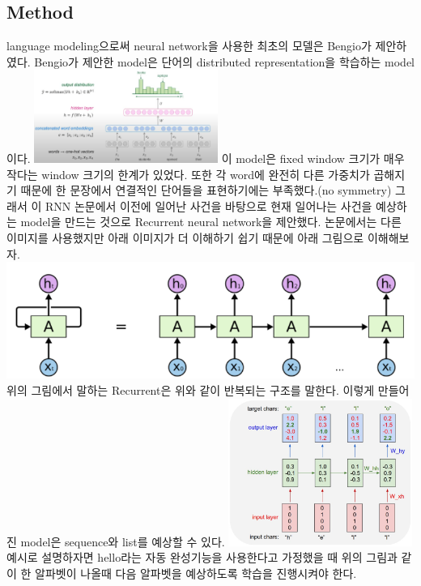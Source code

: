 \documentclass[extendedabs]{bmvc2k}
\begin{document}
 \subsection{Method}
 \quad  language modeling으로써 neural network을 사용한 최초의 모델은 Bengio가 제안하였다\cite{bengio2000neural}. Bengio가 제안한 model은 단어의 distributed representation을 
 학습하는 model이다. 
 \newline  \includegraphics[width=6cm]{images/07_language.PNG}
 \newline 이 model은 fixed window 크기가 매우 작다는 window 크기의 한계가 있었다. 또한 각 word에 완전히 다른 가중치가 곱해지기 때문에
 한 문장에서 연결적인 단어들을 표현하기에는 부족했다.(no symmetry) 그래서 이 RNN 논문에서 이전에 일어난 사건을 바탕으로 현재 일어나는 사건을
 예상하는 model을 만드는 것으로 Recurrent neural network을 제안했다. 논문에서는 다른 이미지를 사용했지만 아래 이미지가 더 이해하기 쉽기 때문에 아래 그림으로
 이해해보자. 
 \newline  \includegraphics[width=\linewidth]{images/00_language.PNG}
 위의 그림에서 말하는 Recurrent은 위와 같이 반복되는 구조를 말한다. 이렇게 만들어진 model은 sequence와 list를 예상할 수 있다.
 \newline  \includegraphics[width=6cm]{images/01_language.PNG}
 \newline 예시로 설명하자면 hello라는 자동 완성기능을 사용한다고 가정했을 때 위의 그림과 같이 한 알파벳이 나올때 다음 알파벳을 예상하도록 학습을 진행시켜야 한다.
\end{document}
